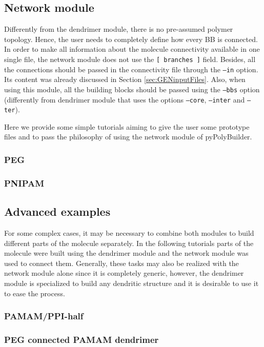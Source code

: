 \documentclass[12pt]{article}
\begin{document}
\subsection{Network module}
Differently from the dendrimer module, there is no pre-assumed polymer topology.
Hence, the user needs to completely define how every BB is connected.
In order to make all information about the molecule connectivity available in one single file, the network module does not use the \texttt{[ branches ]} field.
Besides, all the connections should be passed in the connectivity file through the \texttt{--in} option.
Its content was already discussed in Section \ref{sec:GENinputFiles}.
Also, when using this module, all the building blocks should be passed using the \texttt{--bbs} option (differently from dendrimer module that uses the options \texttt{--core}, \texttt{--inter} and \texttt{--ter}).

Here we provide some simple tutorials aiming to give the user some prototype files and to pass the philosophy of using the network module of pyPolyBuilder.

\subsubsection{PEG}

\clearpage

\subsubsection{PNIPAM}

\clearpage

% 

% 


\subsection{Advanced examples}
For some complex cases, it may be necessary to combine both modules to build different parts of the molecule separately. 
In the following tutorials parts of the molecule were built using the dendrimer module and the network module was used to connect them.
Generally, these tasks may also be realized with the network module alone since it is completely generic, however, the dendrimer module is specialized to build any dendritic structure and it is desirable to use it to ease the process.

\subsubsection{PAMAM/PPI-half}

\clearpage

\subsubsection{PEG connected PAMAM dendrimer}

\clearpage

\end{document}
